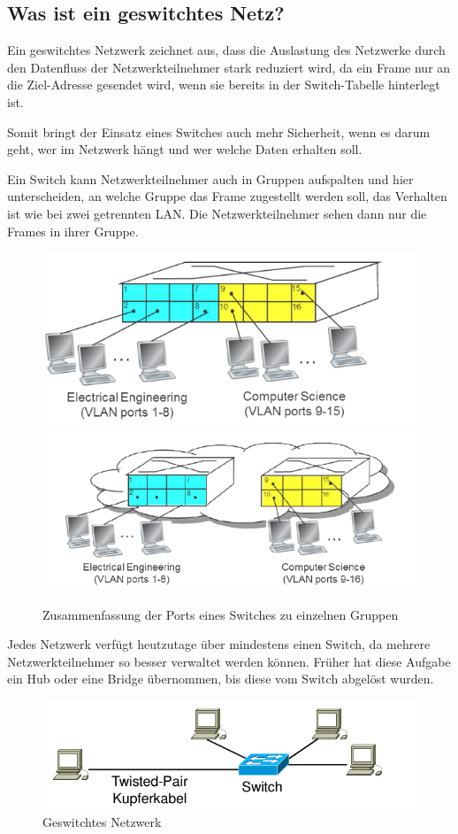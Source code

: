 \subsection{Was ist ein geswitchtes Netz?}
\label{sec:geswitchtes_netz}
Ein geswitchtes Netzwerk zeichnet aus, dass die Auslastung des Netzwerke durch den Datenfluss der Netzwerkteilnehmer stark reduziert wird, da ein Frame nur an die Ziel-Adresse gesendet wird, wenn sie bereits in der Switch-Tabelle hinterlegt ist.

Somit bringt der Einsatz eines Switches auch mehr Sicherheit, wenn es darum geht, wer im Netzwerk hängt und wer welche Daten erhalten soll.

Ein Switch kann Netzwerkteilnehmer auch in Gruppen aufspalten und hier unterscheiden, an welche Gruppe das Frame zugestellt werden soll, das Verhalten ist wie bei zwei getrennten LAN.
Die Netzwerkteilnehmer sehen dann nur die Frames in ihrer Gruppe.

\begin{figure}[H]
	\centering
	\includegraphics[width=0.7\linewidth]{images/VLAN_1.png}
	\includegraphics[width=0.8\linewidth]{images/VLAN_2.png}
	\caption{Zusammenfassung der Ports eines Switches zu einzelnen Gruppen \cite[Kapitel 5, Abbildung Folie 41]{netzwerkeI}}
\end{figure}

Jedes Netzwerk verfügt heutzutage über mindestens einen Switch, da mehrere Netzwerkteilnehmer so besser verwaltet werden können.
Früher hat diese Aufgabe ein Hub oder eine Bridge übernommen, bis diese vom Switch abgelöst wurden.
\begin{figure}[H]
	\centering
	\includegraphics[width=1\linewidth]{images/geswitchtes_netz.png}
	\caption{Geswitchtes Netzwerk \cite[Kapitel 5, Abbildung Folie 33]{netzwerkeI}}
\end{figure}
